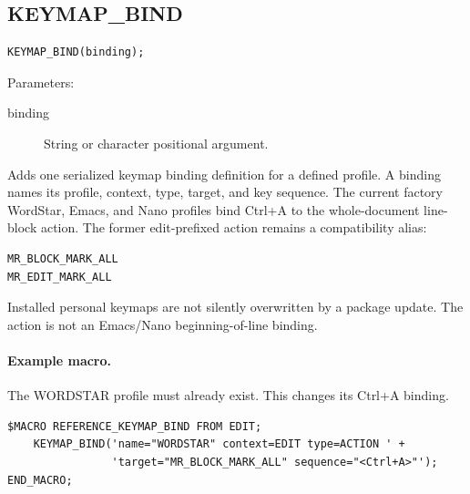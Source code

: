 \documentclass[a4paper,10pt,twoside,openany]{book}
\newenvironment{mrmacextension}{\begin{changebar}}{\end{changebar}}
\begin{document}
\begin{mrmacextension}
\label{prim:procedure-keymap-bind}
\subsection*{KEYMAP\_BIND}
\begin{verbatim}
KEYMAP_BIND(binding);
\end{verbatim}
Parameters:
\begin{description}
\item[binding] String or character positional argument.
\end{description}

Adds one serialized keymap binding definition for a defined profile. A
binding names its profile, context, type, target, and key sequence. The current
factory WordStar, Emacs, and Nano profiles bind Ctrl+A to the whole-document
line-block action. The former edit-prefixed action remains a compatibility
alias:
\begin{verbatim}
MR_BLOCK_MARK_ALL
MR_EDIT_MARK_ALL
\end{verbatim}
Installed personal keymaps are not silently overwritten by a package update.
The action is not an Emacs/Nano beginning-of-line binding.

\paragraph{Example macro.}
The WORDSTAR profile must already exist. This changes its Ctrl+A binding.
\begin{verbatim}
$MACRO REFERENCE_KEYMAP_BIND FROM EDIT;
    KEYMAP_BIND('name="WORDSTAR" context=EDIT type=ACTION ' +
                'target="MR_BLOCK_MARK_ALL" sequence="<Ctrl+A>"');
END_MACRO;
\end{verbatim}
\end{mrmacextension}
\end{document}
